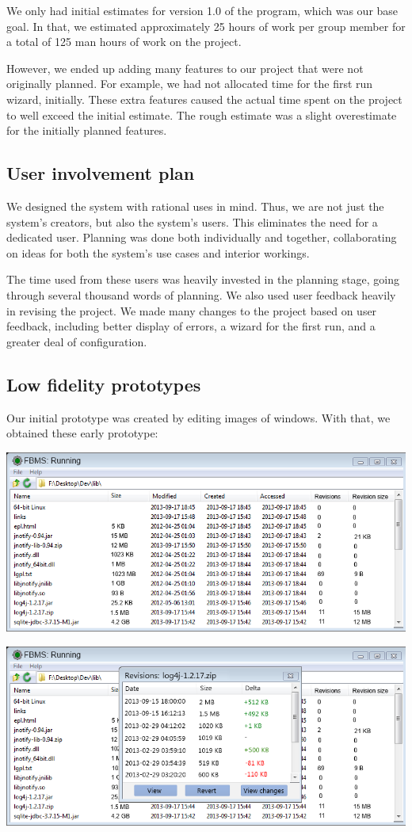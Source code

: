 \documentclass[12pt,a4paper]{article}
\begin{document}
We only had initial estimates for version 1.0 of the program, which was our base goal. In that, we estimated approximately 25 hours of work per group member for a total of 125 man hours of work on the project.

However, we ended up adding many features to our project that were not originally planned. For example, we had not allocated time for the first run wizard, initially. These extra features caused the actual time spent on the project to well exceed the initial estimate. The rough estimate was a slight overestimate for the initially planned features.

\subsection{User involvement plan}
We designed the system with rational uses in mind. Thus, we are not just the system's creators, but also the system's users. This eliminates the need for a dedicated user. Planning was done both individually and together, collaborating on ideas for both the system's use cases and interior workings.

The time used from these users was heavily invested in the planning stage, going through several thousand words of planning. We also used user feedback heavily in revising the project. We made many changes to the project based on user feedback, including better display of errors, a wizard for the first run, and a greater deal of configuration.

\subsection{Low fidelity prototypes}
Our initial prototype was created by editing images of windows. With that, we obtained these early prototype:

\includegraphics[width=\linewidth]{images/concept.png}

\includegraphics[width=\linewidth]{images/concept2.png}
\end{document}
